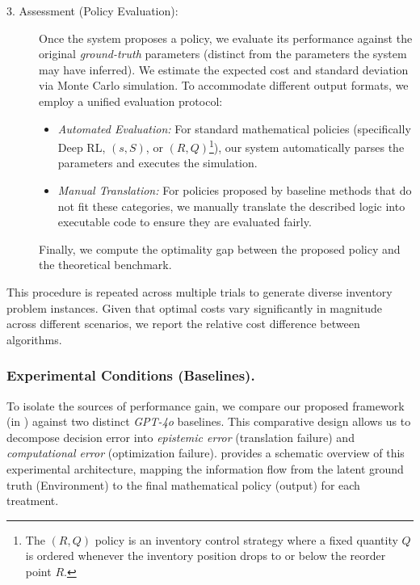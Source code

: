 \documentclass[mnsc,nonblindrev]{informs3_hide}
\begin{document}
\begin{description}
    \item[3. Assessment (Policy Evaluation):]
    Once the system proposes a policy, we evaluate its performance against the original \textit{ground-truth} parameters (distinct from the parameters the system may have inferred). We estimate the expected cost and standard deviation via Monte Carlo simulation.
    To accommodate different output formats, we employ a unified evaluation protocol: 
    \begin{itemize}[label=-]
        \item \emph{Automated Evaluation:} For standard mathematical policies (specifically Deep RL, $(s, S)$, or $(R, Q)$\footnote{The $(R, Q)$ policy is an inventory control strategy where a fixed quantity $Q$ is ordered whenever the inventory position drops to or below the reorder point $R$.}), our system automatically parses the parameters and executes the simulation.
        \item \emph{Manual Translation:} For policies proposed by baseline methods that do not fit these categories, we manually translate the described logic into executable code to ensure they are evaluated fairly.
    \end{itemize}
    Finally, we compute the optimality gap between the proposed policy and the theoretical benchmark.
\end{description}

This procedure is repeated across multiple trials to generate diverse inventory problem instances. Given that optimal costs vary significantly in magnitude across different scenarios, we report the relative cost difference between algorithms.

\subsubsection{Experimental Conditions (Baselines).}\label{sec:benchmarks}
To isolate the sources of performance gain, we compare our proposed framework (in ) against two distinct \emph{GPT-4o} baselines. This comparative design allows us to decompose decision error into \textit{epistemic error} (translation failure) and \textit{computational error} (optimization failure).
 provides a schematic overview of this experimental architecture, mapping the information flow from the latent ground truth (Environment) to the final mathematical policy (output) for each treatment.
\end{document}
